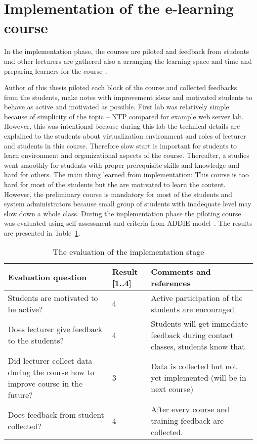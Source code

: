 \section{Implementation of the e-learning course}

In the implementation phase, the courses are piloted and feedback from students and other lecturers are gathered also a arranging the learning space and time and preparing learners for the course~\citep{OppeArenduskeskus2010}.

Author of this thesis piloted each block of the course and collected feedbacks from the students, make notes with improvement ideas and motivated students to behave as active and motivated as possible.
First lab was relatively simple because of simplicity of the topic -- \gls{NTP} compared for example web server lab. However, this was intentional because during this lab the technical details are explained to the students about virtualization environment and roles of lecturer and students in this course. Therefore slow start is important for students to learn environment and organizational aspects of the course. Thereafter, a studies went smoothly for students with proper prerequisite skills and knowledge and hard for others. The main thing learned from implementation: This course is too hard for most of the students but the are motivated to learn the content. However, the preliminary course is mandatory for most of the students and system administrators because small group of students with inadequate level may slow down a whole class. During the implementation phase the piloting course was evaluated using self-assessment and criteria from \gls{ADDIE} model~\citep{OppeArenduskeskus2010}. The results are presented in Table~\ref{table:implementation_evaluation}.

\begin{table}[h]
\centering
\caption{The evaluation of the implementation stage }
{ \small 
\begin{tabular}{|p{6cm}|p{2cm}|p{5cm}|}
\hline 
\color{blue} Evaluation question & \color{blue} Result [1..4] & \color{blue} Comments and references \\ 
\hline
Students are motivated to be active? 
& 4  &  Active participation of the students are encouraged \\ 
\hline 
Does lecturer give feedback to the students?
& 4 &  Students will get immediate feedback during contact classes, students know that \\ 
\hline 
Did lecturer collect data during the course how to improve course in the future?
& 3 & Data is collected but not yet implemented (will be in next course) \\ 
\hline
Does feedback from student collected?
& 4 & After every course and training feedback are collected. \\ 
\hline 
\end{tabular} 
}
\label{table:implementation_evaluation}
\end{table}

